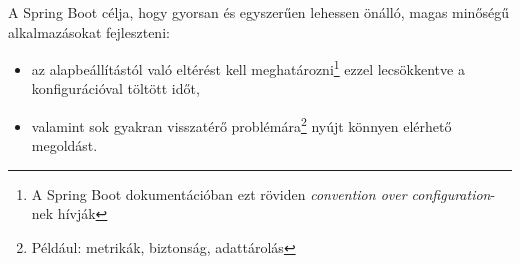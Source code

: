 A Spring Boot \cite{introducing_spring_boot} célja, hogy gyorsan és egyszerűen lehessen önálló, magas minőségű alkalmazásokat fejleszteni:
\begin{itemize}
	\item az alapbeállítástól való eltérést kell meghatározni\footnote{A Spring Boot dokumentációban ezt röviden \textit{convention over configuration}-nek hívják} ezzel lecsökkentve a konfigurációval töltött időt,
	\item valamint sok gyakran visszatérő problémára\footnote{Például: metrikák, biztonság, adattárolás} nyújt könnyen elérhető megoldást.
\end{itemize}



